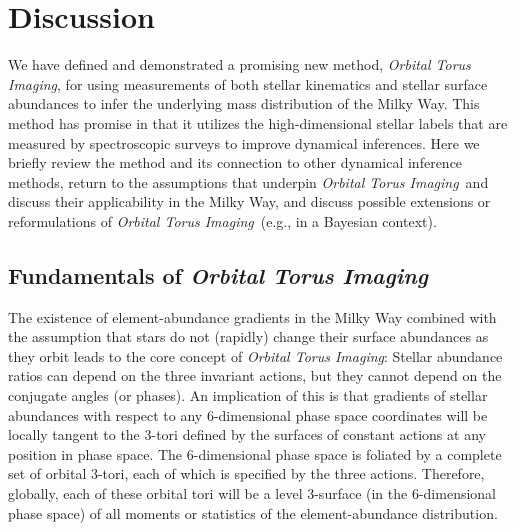 \documentclass[modern]{aastex63}
\newcommand{\methodname}{\textsl{Orbital Torus Imaging}}
\begin{document}
\section{Discussion}
\label{sec:discussion}

We have defined and demonstrated a promising new method, \methodname, for using
measurements of both stellar kinematics and stellar surface abundances to infer
the underlying mass distribution of the Milky Way.
This method has promise in that it utilizes the high-dimensional stellar labels
that are measured by spectroscopic surveys to improve dynamical inferences.
Here we briefly review the method and its connection to other dynamical
inference methods, return to the assumptions that underpin \methodname\ and
discuss their applicability in the Milky Way, and discuss possible extensions or
reformulations of \methodname\ (e.g., in a Bayesian context).

\subsection{Fundamentals of \methodname}

The existence of element-abundance gradients in the Milky Way combined with the
assumption that stars do not (rapidly) change their surface abundances as
they orbit leads to the core concept of \methodname:
Stellar abundance ratios can depend on the three invariant actions, but they
cannot depend on the conjugate angles (or phases).
An implication of this is that gradients of stellar abundances with respect to
any 6-dimensional phase space coordinates will be locally tangent to the 3-tori
defined by the surfaces of constant actions at any position in phase space.
The 6-dimensional phase space is foliated by a complete set of orbital
3-tori, each of which is specified by the three actions.
Therefore, globally, each of these orbital tori will be a level 3-surface (in
the 6-dimensional phase space) of all moments or statistics of the
element-abundance distribution.
\end{document}
